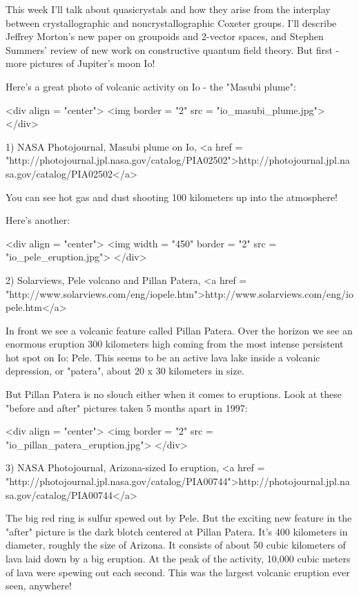 


This week I'll talk about quasicrystals and how they arise from
the interplay between crystallographic and noncrystallographic
Coxeter groups.  I'll describe Jeffrey Morton's new paper on
groupoids and 2-vector spaces, and Stephen Summers' review of
new work on constructive quantum field theory.  But first - more
pictures of Jupiter's moon Io!

Here's a great photo of volcanic activity on Io -
the "Masubi plume":

<div align = "center">
<img border = "2" src = "io_masubi_plume.jpg"> 
</div>

1) NASA Photojournal, Masubi plume on Io, 
<a href = "http://photojournal.jpl.nasa.gov/catalog/PIA02502">http://photojournal.jpl.nasa.gov/catalog/PIA02502</a>

You can see hot gas and dust shooting 100 kilometers up into the
atmosphere!  

Here's another:

<div align = "center">
<img width = "450" border = "2" src = "io_pele_eruption.jpg"> 
</div>

2) Solarviews, Pele volcano and Pillan Patera,
<a href = "http://www.solarviews.com/eng/iopele.htm">http://www.solarviews.com/eng/iopele.htm</a>

In front we see a volcanic feature called Pillan Patera.  Over the 
horizon we see an enormous eruption 300 kilometers high coming from
the most intense persistent hot spot on Io: Pele.  This seems to be 
an active lava lake inside a volcanic depression, or "patera", about 
20 x 30 kilometers in size.

But Pillan Patera is no slouch either when it comes to eruptions.  
Look at these "before and after" pictures taken 5 months apart in 1997:


<div align = "center">
<img border = "2" src = "io_pillan_patera_eruption.jpg"> 
</div>

3) NASA Photojournal, Arizona-sized Io eruption, 
<a href = "http://photojournal.jpl.nasa.gov/catalog/PIA00744">http://photojournal.jpl.nasa.gov/catalog/PIA00744</a>

The big red ring is sulfur spewed out by Pele.  But the exciting new 
feature in the "after" picture is the dark blotch centered at Pillan 
Patera.  It's 400 kilometers in diameter, roughly the size of Arizona.
It consists of about 50 cubic kilometers of lava laid down by a big
eruption.  At the peak
of the activity, 10,000 cubic meters of lava were spewing out
each second.  This was the largest volcanic eruption ever seen, anywhere!

